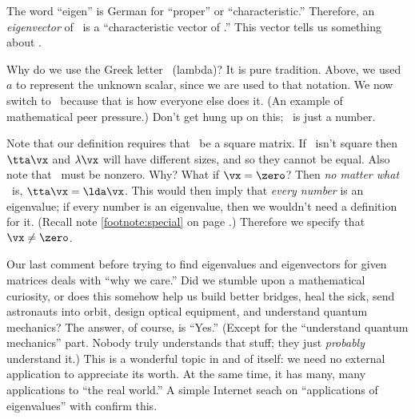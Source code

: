 \smallskip


\smallskip

The word ``eigen'' is German for ``proper'' or ``characteristic.'' Therefore, an \textit{eigenvector} of \tta\ is a ``characteristic vector of \tta.'' This vector tells us something about \tta. 

Why do we use the Greek letter \lda\ (lambda)? It is pure tradition. Above, we used $a$ to represent the unknown scalar, since we are used to that notation. We now switch to \lda\ because that is how everyone else does it. (An example of mathematical peer pressure.) %
 Don't get hung up on this; \lda\ is just a number.

Note that our definition requires that \tta\ be a square matrix.
If \tta\ isn't square then $\tta\vx$ and $\lambda\vx$ will have different sizes, and so they cannot be equal. Also note that \vx\ must be nonzero. Why? What if $\vx = \zero$? Then \textit{no matter what} \lda\ is, $\tta\vx = \lda\vx$. This would then imply that \textit{every number} is an eigenvalue; if every number is an eigenvalue, then we wouldn't need a definition for 
it. (Recall note \ref{footnote:special} on page \pageref{footnote:special}.) Therefore we specify that $\vx\neq \zero$.

Our last comment before trying to find eigenvalues and eigenvectors for given matrices deals with ``why we care.'' Did we stumble upon a mathematical curiosity, or does this somehow help us build better bridges, heal the sick, send astronauts into orbit, design optical equipment, and understand quantum mechanics? The answer, of course, is ``Yes.'' (Except for the ``understand quantum mechanics'' part. Nobody truly understands that stuff; they just \textit{probably} understand it.) This is a wonderful topic in and of itself: we need no external application to appreciate its worth. At the same time, it has many, many applications to ``the real world.'' A simple Internet seach on ``applications of eigenvalues'' with confirm this.

